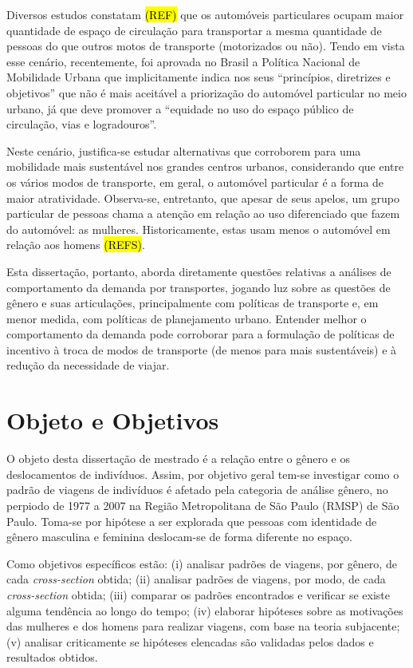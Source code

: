 Diversos estudos constatam \hl{(REF)} que os automóveis particulares ocupam maior quantidade de espaço de circulação para transportar a mesma quantidade de pessoas do que outros motos de transporte (motorizados ou não).  
Tendo em vista esse cenário, recentemente, foi aprovada no Brasil a Política Nacional de Mobilidade Urbana \cite{PNMU} que implicitamente indica nos seus ``princípios, diretrizes e objetivos'' que não é mais aceitável a priorização do automóvel particular no meio urbano, já que deve promover a ``equidade no uso do espaço público de circulação, vias e logradouros''.

Neste cenário, justifica-se estudar alternativas que corroborem para uma mobilidade mais sustentável nos grandes centros urbanos, considerando que entre os vários modos de transporte, em geral, o automóvel particular é a forma de maior atratividade. Observa-se, entretanto, que apesar de seus apelos, um grupo particular de pessoas chama a atenção em relação ao uso diferenciado que fazem do automóvel: as mulheres.
Historicamente, estas usam menos o automóvel em relação aos homens \hl{(REFS)}.

Esta dissertação, portanto, aborda diretamente questões relativas a análises de comportamento da demanda por transportes, jogando luz sobre as questões de  gênero e suas articulações, principalmente com políticas de transporte e, em menor medida, com políticas de planejamento urbano. Entender melhor o comportamento da demanda pode corroborar para a formulação de políticas de incentivo à troca de modos de transporte (de menos para mais sustentáveis) e à redução da necessidade de viajar.

\section{Objeto e Objetivos}
O objeto desta dissertação de mestrado é a relação entre o gênero e os deslocamentos de indivíduos. Assim, por objetivo geral tem-se investigar como o padrão de viagens de indivíduos é afetado pela categoria de análise gênero, no perpiodo de 1977 a 2007 na Região Metropolitana de São Paulo (RMSP) de São Paulo. Toma-se por hipótese a ser explorada que pessoas com identidade de gênero masculina e feminina deslocam-se de forma diferente no espaço.

Como objetivos específicos estão: (i) analisar padrões de viagens, por gênero, de cada \emph{cross-section} obtida; (ii) analisar padrões de viagens, por modo, de cada \emph{cross-section} obtida; (iii) comparar os padrões encontrados e verificar se existe alguma tendência ao longo do tempo; (iv) elaborar hipóteses sobre as motivações das mulheres e dos homens para realizar viagens, com base na teoria subjacente; (v) analisar criticamente se hipóteses elencadas são validadas pelos dados e resultados obtidos.

